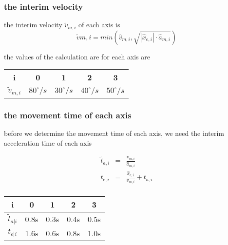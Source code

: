 \documentclass[professionalfonts, 
               xcolor={ usenames, %
                        dvipsnames,%
                        svgnames,%
                        table,%
                        hyperref%
                      }
              ]{beamer}
\begin{document}
\subsubsection*{the interim velocity}
\begin{frame}
the interim velocity $\tilde{v}_{m,i}$ of each axis is 
\begin{equation*}
\tilde{v}{m,i} = min\left(\hat{v}_{m,i},\sqrt{|\hat{x}_{e,i}| \cdot \hat{a}_{m,i}} \right) 
\end{equation*}

the values of the calculation are for each axis are
\begin{center}
\begin{tabular}{ccccc}
\toprule
i & 0 & 1 & 2 & 3 \\
\midrule
$\tilde{v}_{m,i}$ & $80^\circ/s$ & $30^\circ/s$ & $40^\circ/s$ & $50^\circ/s$ \\
\bottomrule
\end{tabular}               
\end{center}  
\end{frame}

\subsubsection*{the movement time of each axis}
\begin{frame}
before we determine the movement time of each axis, we need the interim acceleration time of each axis

\begin{eqnarray}
\tilde{t}_{a,i} & = & \frac{v_{m,i}}{\hat{a}_{m,i}} \\
t_{e,i} & = & \frac{\hat{x}_{e,i}}{v_{m,i}} + t_{a,i} \\
\end{eqnarray}

\begin{center}
\begin{tabular}{ccccc}
\toprule
i & 0 & 1 & 2 & 3 \\
\midrule
$\tilde{t}_{a|i}$ & 0.8s & 0.3s & 0.4s & 0.5s \\ 
$t_{e|i}$ & 1.6s & 0.6s & 0.8s & 1.0s \\
\bottomrule 
\end{tabular}
\end{center} 
\end{frame}
\end{document}
